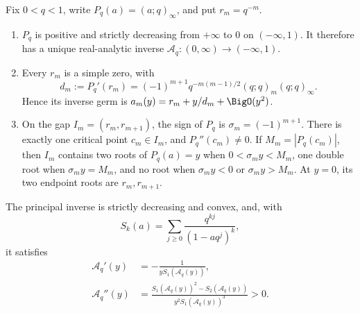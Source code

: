 \begin{theorem}
\label{thm:ip-real-atlas}
Fix \(0<q<1\), write \(P_q(a)=(a;q)_\infty\), and put
\(r_m=q^{-m}\).
\begin{enumerate}
\item \(P_q\) is positive and strictly decreasing from \(+\infty\) to \(0\)
  on \((-\infty,1)\).  It therefore has a unique real-analytic inverse
  \(\mathcal A_q:(0,\infty)\to(-\infty,1)\).
\item Every \(r_m\) is a simple zero, with
  \begin{equation}
   d_m:=P_q'(r_m)=(-1)^{m+1}q^{-m(m-1)/2}
   (q;q)_m(q;q)_\infty.
   \label{eq:ip-zero-derivative}
  \end{equation}
  Hence its inverse germ is \(a_m(y)=r_m+y/d_m+\BigO(y^2)\).
\item On the gap \(I_m=(r_m,r_{m+1})\), the sign of \(P_q\) is
  \(\sigma_m=(-1)^{m+1}\).  There is exactly one critical point
  \(c_m\in I_m\), and \(P_q''(c_m)\ne0\).  If
  \(M_m=|P_q(c_m)|\), then \(I_m\) contains two roots of \(P_q(a)=y\)
  when \(0<\sigma_my<M_m\), one double root when
  \(\sigma_my=M_m\), and no root when
  \(\sigma_my<0\) or \(\sigma_my>M_m\).  At \(y=0\), its two endpoint
  roots are \(r_m,r_{m+1}\).
\end{enumerate}
The principal inverse is strictly decreasing and convex, and, with
\[
 S_k(a)=\sum_{j\geq0}\frac{q^{kj}}{(1-aq^j)^k},
\]
it satisfies
\begin{align}
 \mathcal A_q'(y)&=-\frac1{yS_1(\mathcal A_q(y))},
 \label{eq:ip-principal-first}\\
 \mathcal A_q''(y)&=
 \frac{S_1(\mathcal A_q(y))^2-S_2(\mathcal A_q(y))}
 {y^2S_1(\mathcal A_q(y))^3}>0.
 \label{eq:ip-principal-second}
\end{align}
\end{theorem}

